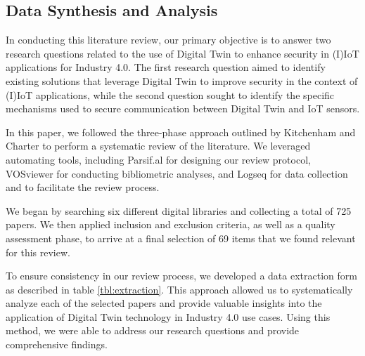 \subsection{Data Synthesis and Analysis }

\label{Chapter2} %
In conducting this literature review, our primary objective is to answer two research questions related to the use of Digital Twin to enhance security in (I)IoT applications for Industry 4.0. The first research question aimed to identify existing solutions that leverage Digital Twin to improve security in the context of (I)IoT applications, while the second question sought to identify the specific mechanisms used to secure communication between Digital Twin and IoT sensors.

In this paper, we followed the three-phase approach outlined by Kitchenham and Charter \cite{kitchenham_guidelines_2007} to perform a systematic review of the literature. We leveraged automating tools, including Parsif.al for designing our review protocol, VOSviewer for conducting bibliometric analyses, and Logseq for data collection and to facilitate the review process.

We began by searching six different digital libraries and collecting a total of 725 papers. We then applied inclusion and exclusion criteria, as well as a quality assessment phase, to arrive at a final selection of 69 items that we found relevant for this review.

To ensure consistency in our review process, we developed a data extraction form as described in table \ref{tbl:extraction}. This approach allowed us to systematically analyze each of the selected papers and provide valuable insights into the application of Digital Twin technology in Industry 4.0 use cases. Using this method, we were able to address our research questions and provide comprehensive findings.




